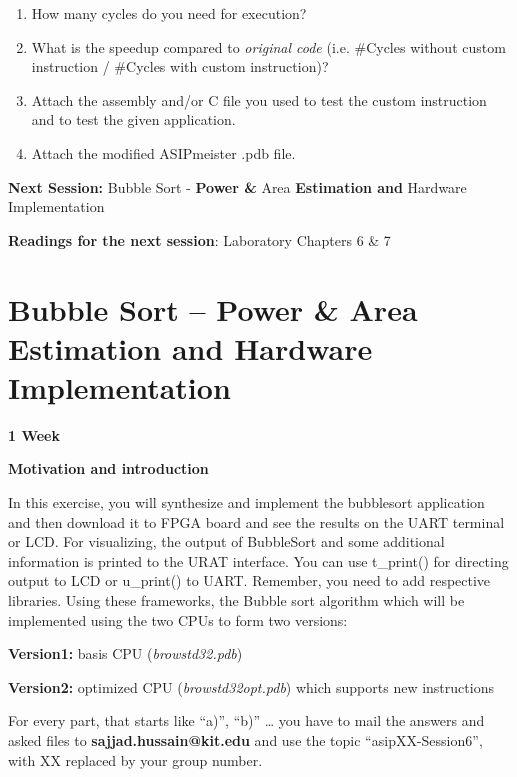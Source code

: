 \documentclass[
]{article}
\begin{document}
\begin{enumerate}
\def\labelenumi{\alph{enumi})}
\item
  How many cycles do you need for execution?
\item
  What is the speedup compared to \emph{original code} (i.e. \#Cycles
  without custom instruction / \#Cycles with custom instruction)?
\item
  Attach the assembly and/or C file you used to test the custom
  instruction and to test the given application.
\item
  Attach the modified ASIPmeister .pdb file.
\end{enumerate}

\textbf{Next Session:} Bubble Sort - \textbf{Power \&} Area
\textbf{Estimation and} Hardware Implementation

\textbf{Readings for the next session}: Laboratory Chapters 6 \& 7

\hypertarget{bubble-sort-power-area-estimation-and-hardware-implementation}{%
\section{\texorpdfstring{\textbf{Bubble Sort -- Power \&} Area
\textbf{Estimation and Hardware
Implementation}}{Bubble Sort -- Power \& Area Estimation and Hardware Implementation}}\label{bubble-sort-power-area-estimation-and-hardware-implementation}}

\textbf{{1 Week}}

\textbf{Motivation and introduction}

In this exercise, you will synthesize and implement the bubblesort
application and then download it to FPGA board and see the results on
the UART terminal or LCD. For visualizing, the output of BubbleSort and
some additional information is printed to the URAT interface. You can
use t\_print() for directing output to LCD or u\_print() to UART.
Remember, you need to add respective libraries. Using these frameworks,
the Bubble sort algorithm which will be implemented using the two CPUs
to form two versions:

\textbf{Version1:} basis CPU (\emph{browstd32.pdb})

\textbf{Version2:} optimized CPU (\emph{browstd32opt.pdb}) which
supports new instructions

For every part, that starts like ``a)'', ``b)'' \ldots{} you have to
mail the answers and asked files to \textbf{sajjad.hussain@kit.edu} and
use the topic ``asipXX-Session6'', with XX replaced by your group
number.
\end{document}
